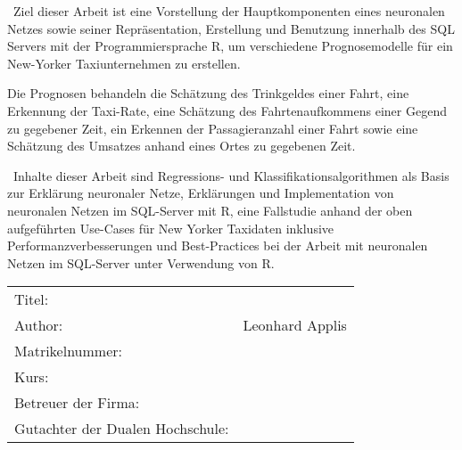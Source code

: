 ~\newline Ziel dieser Arbeit ist eine Vorstellung der Hauptkomponenten eines neuronalen Netzes sowie seiner Repräsentation, Erstellung und Benutzung innerhalb des SQL Servers mit der Programmiersprache R, um verschiedene Prognosemodelle für ein New-Yorker Taxiunternehmen zu erstellen.

Die Prognosen behandeln die Schätzung des Trinkgeldes einer Fahrt, eine Erkennung der Taxi-Rate, eine Schätzung des Fahrtenaufkommens einer Gegend zu gegebener Zeit, ein Erkennen der Passagieranzahl einer Fahrt sowie eine Schätzung des Umsatzes anhand eines Ortes zu gegebenen Zeit.  

~\newline Inhalte dieser Arbeit sind Regressions- und Klassifikationsalgorithmen als Basis zur Erklärung neuronaler Netze, Erklärungen und Implementation von neuronalen Netzen im SQL-Server mit R, eine Fallstudie anhand der oben aufgeführten Use-Cases für New Yorker Taxidaten inklusive Performanzverbesserungen und Best-Practices bei der Arbeit mit neuronalen Netzen im SQL-Server unter Verwendung von R.
~\newline
~\newline
\begin{flushleft}
	\begin{tabular}{ll}
		Titel:& \quad \titel \\ 
		Author:& \quad Leonhard Applis \\
		Matrikelnummer: & \quad \matrikelnr  \\
		Kurs: & \quad \kurs \\ 
		Betreuer der Firma: & \quad \betreuerfirma \\	Gutachter der Dualen Hochschule: & \quad \betreuerdhbw \\ 
		[6ex]%
	\end{tabular} 
\end{flushleft}